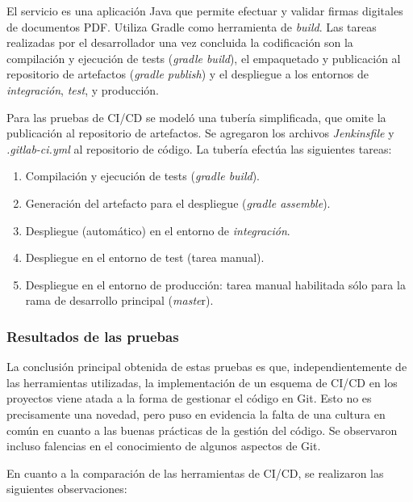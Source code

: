 El servicio es una aplicación Java que permite efectuar y validar firmas digitales de documentos PDF. Utiliza Gradle como herramienta de \textit{build}. Las tareas realizadas por el desarrollador una vez concluida la codificación son la compilación y ejecución de tests (\textit{gradle build}), el empaquetado y publicación al repositorio de artefactos (\textit{gradle publish}) y el despliegue a los entornos de \textit{integración}, \textit{test}, y producción.

Para las pruebas de CI/CD se modeló una tubería simplificada, que omite la publicación al repositorio de artefactos. Se agregaron los archivos \textit{Jenkinsfile} y \textit{.gitlab-ci.yml} al repositorio de código. La tubería efectúa las siguientes tareas:

\begin{enumerate}
\item Compilación y ejecución de tests (\textit{gradle build}).
\item Generación del artefacto para el despliegue (\textit{gradle assemble}).
\item Despliegue (automático) en el entorno de \textit{integración}.
\item Despliegue en el entorno de test (tarea manual).
\item Despliegue en el entorno de producción: tarea manual habilitada sólo para la rama de desarrollo principal (\textit{maste}r).
\end{enumerate}
\subsubsection{Resultados de las pruebas}

La conclusión principal obtenida de estas pruebas es que, independientemente de las herramientas utilizadas, la implementación de un esquema de CI/CD en los proyectos viene atada a la forma de gestionar el código en Git. Esto no es precisamente una novedad, pero puso en evidencia la falta de una cultura en común en cuanto a las buenas prácticas de la gestión del código. Se observaron incluso falencias en el conocimiento de algunos aspectos de Git. 

En cuanto a la comparación de las herramientas de CI/CD, se realizaron las siguientes observaciones:


